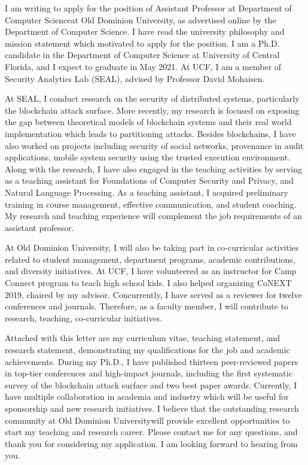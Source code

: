 \documentclass[10pt,stdletter]{newlfm}
\newcommand{\univ}{Old Dominion University}
\newcommand{\depart}{Department of Computer Science}
\begin{document}
\begin{newlfm}

I am writing to apply for the position of Assistant Professor at \depart at \univ, as advertised online by the \depart. I have read the university philosophy and mission statement which motivated to apply for the position. I am a Ph.D. candidate in the Department of Computer Science at University of Central Florida, and I expect to graduate in May 2021. At UCF, I am a member of Security Analytics Lab (SEAL), advised by Professor David Mohaisen. 

At SEAL, I conduct research on the security of distributed systems, particularly the blockchain attack surface. More recently, my research is focused on exposing the gap between theoretical models of blockchain systems and their real world implementation which leads to partitioning attacks. Besides blockchains, I have also worked on projects including security of social networks, provenance in audit applications, mobile system security using the trusted execution environment. Along with the research, I have also engaged in the teaching activities by serving as a teaching assistant for Foundations of Computer Security and Privacy, and Natural Language Processing. As a teaching assistant, I acquired preliminary training in course management, effective communication, and student coaching. My research and teaching experience will complement the job requirements of an assistant professor. 

At \univ, I will also be taking part in co-curricular activities related to student management, department programs, academic contributions, and diversity initiatives. At UCF, I have volunteered as an instructor for Camp Connect program to teach high school kids. I also helped organizing CoNEXT 2019, chaired by my advisor. Concurrently, I have served as a reviewer for twelve conferences and journals. Therefore, as a faculty member, I will contribute to research, teaching, co-curricular initiatives. 




Attached with this letter are my curriculum vitae, teaching statement, and research statement, demonstrating my qualifications for the job and academic achievements. During my Ph.D., I have published thirteen peer-reviewed papers in top-tier conferences and high-impact journals, including the first systematic survey of the blockchain attack surface and two best paper awards. Currently, I have multiple collaboration in academia and industry which will be useful for sponsorship and new research initiatives. I believe that the outstanding research community at \univ will provide excellent opportunities to start my teaching and research career. Please contact me for any questions, and thank you for considering my application. I am looking forward to hearing from you.

\end{newlfm}
\end{document}
